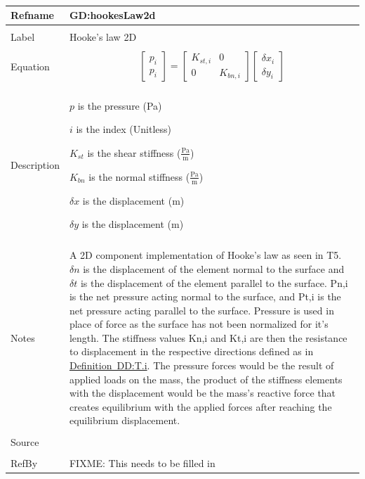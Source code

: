 \documentclass[12pt]{article}
\begin{document}
~\newline
\noindent \begin{minipage}{\textwidth}
\begin{tabular}{p{} p{}}
\toprule \textbf{Refname} & \textbf{GD:hookesLaw2d}
\label{GD:hookesLaw2d}
\\ \midrule \\
Label & Hooke's law 2D
\\ \midrule \\
Equation & \begin{dmath}
           \begin{bmatrix}
p_{i}\\
p_{i}
\end{bmatrix}=\begin{bmatrix}
{K_{st,i}} & 0\\
0 & {K_{bn,i}}
\end{bmatrix} \begin{bmatrix}
{δx}_{i}\\
{δy}_{i}
\end{bmatrix}
 	   \end{dmath}
\\ \midrule \\
Description & \begin{symbDescription}
              \item{$p$ is the pressure (Pa)}
              \item{$i$ is the index (Unitless)}
              \item{${K_{st}}$ is the shear stiffness ($\frac{\text{Pa}}{\text{m}}$)}
              \item{${K_{bn}}$ is the normal stiffness ($\frac{\text{Pa}}{\text{m}}$)}
              \item{$δx$ is the displacement (m)}
              \item{$δy$ is the displacement (m)}
              \end{symbDescription}
\\ \midrule \\
Notes & A 2D component implementation of Hooke's law as seen in T5. $δn$ is the displacement of the element normal to the surface and $δt$ is the displacement of the element parallel to the surface. Pn,i is the net pressure acting normal to the surface, and Pt,i is the net pressure acting parallel to the surface. Pressure is used in place of force as the surface has not been normalized for it's length. The stiffness values Kn,i and Kt,i are then the resistance to displacement in the respective directions defined as in \hyperref[DD:T.i]{Definition~DD:T.i}. The pressure forces would be the result of applied loads on the mass, the product of the stiffness elements with the displacement would be the mass's reactive force that creates equilibrium with the applied forces after reaching the equilibrium displacement.
\\ \midrule \\
Source &
\\ \midrule \\
RefBy & FIXME: This needs to be filled in
\\ \bottomrule \end{tabular}
\end{minipage}\\
\end{document}
